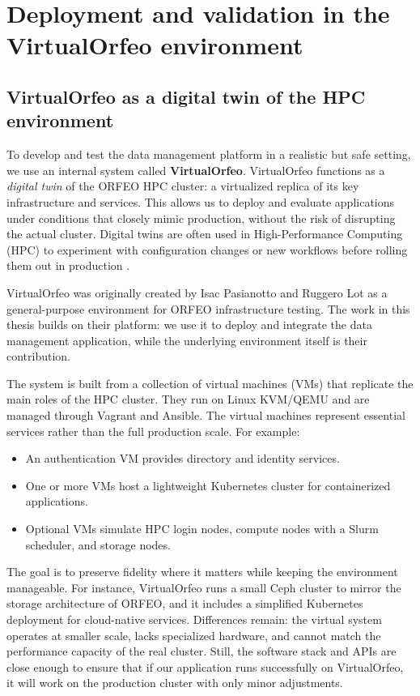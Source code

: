 \chapter{Deployment and validation in the VirtualOrfeo environment}\label{chap:virtualorfeo-deployment}

\section{VirtualOrfeo as a digital twin of the HPC environment}

To develop and test the data management platform in a realistic but safe setting, we use an internal system called \textbf{VirtualOrfeo}. VirtualOrfeo functions as a \emph{digital twin} of the ORFEO HPC cluster: a virtualized replica of its key infrastructure and services. This allows us to deploy and evaluate applications under conditions that closely mimic production, without the risk of disrupting the actual cluster. Digital twins are often used in High-Performance Computing (HPC) to experiment with configuration changes or new workflows before rolling them out in production \parencite{Ohmura2023TwdsDT}.

VirtualOrfeo was originally created by Isac Pasianotto and Ruggero Lot as a general-purpose environment for ORFEO infrastructure testing. The work in this thesis builds on their platform: we use it to deploy and integrate the data management application, while the underlying environment itself is their contribution.

The system is built from a collection of virtual machines (VMs) that replicate the main roles of the HPC cluster. They run on Linux KVM/QEMU and are managed through Vagrant and Ansible. The virtual machines represent essential services rather than the full production scale. For example:  

\begin{itemize}
	\item An authentication VM provides directory and identity services.  
	\item One or more VMs host a lightweight Kubernetes cluster for containerized applications.  
	\item Optional VMs simulate HPC login nodes, compute nodes with a Slurm scheduler, and storage nodes.  
\end{itemize}

The goal is to preserve fidelity where it matters while keeping the environment manageable. For instance, VirtualOrfeo runs a small Ceph cluster to mirror the storage architecture of ORFEO, and it includes a simplified Kubernetes deployment for cloud-native services. Differences remain: the virtual system operates at smaller scale, lacks specialized hardware, and cannot match the performance capacity of the real cluster. Still, the software stack and APIs are close enough to ensure that if our application runs successfully on VirtualOrfeo, it will work on the production cluster with only minor adjustments.

